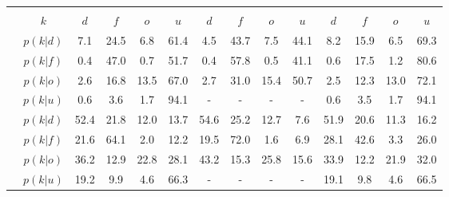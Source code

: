 \begin{center}
\begin{tabular}{c|c|cccc|cccc|cccc}
		\multicolumn{13}{c}{}\\
		&$k$ & $d$ & $f$ & $o$ & $u$ & $d$ & $f$ & $o$ & $u$ & $d$ & $f$ & $o$ & $u$\\
		\hline
		\parbox[t]{2mm}{}&$p(k|d)$ & \textcolor{mygreen}{7.1} & \textcolor{myred}{24.5} & \textcolor{myred}{6.8} & 61.4 & \textcolor{mygreen}{4.5} & \textcolor{myred}{43.7} & \textcolor{myred}{7.5} & 44.1 & \textcolor{mygreen}{8.2} & \textcolor{myred}{15.9} & \textcolor{myred}{6.5} & 69.3\\
		&$p(k|f)$ & \textcolor{myred}{0.4} & \textcolor{mygreen}{47.0} & \textcolor{myred}{0.7} & 51.7 & \textcolor{myred}{0.4} & \textcolor{mygreen}{57.8} & \textcolor{myred}{0.5} & 41.1 & \textcolor{myred}{0.6} & \textcolor{mygreen}{17.5} & \textcolor{myred}{1.2} & 80.6\\
		&$p(k|o)$ & \textcolor{myred}{2.6} & \textcolor{myred}{16.8} & \textcolor{mygreen}{13.5} & 67.0 & \textcolor{myred}{2.7} & \textcolor{myred}{31.0} & \textcolor{mygreen}{15.4} & 50.7 & \textcolor{myred}{2.5} & \textcolor{myred}{12.3} & \textcolor{mygreen}{13.0} & 72.1\\
		&$p(k|u)$ & 0.6 & 3.6 & 1.7 & 94.1 & - & - & - & - & 0.6 & 3.5 & 1.7 & 94.1\\
		\hline
		\parbox[t]{2mm}{}&$p(k|d)$ & \textcolor{mygreen}{52.4} & \textcolor{myred}{21.8} & \textcolor{myred}{12.0} & 13.7 & \textcolor{mygreen}{54.6} & \textcolor{myred}{25.2} & \textcolor{myred}{12.7} & 7.6 & \textcolor{mygreen}{51.9} & \textcolor{myred}{20.6} & \textcolor{myred}{11.3} & 16.2\\
		&$p(k|f)$ & \textcolor{myred}{21.6} & \textcolor{mygreen}{64.1} & \textcolor{myred}{2.0} & 12.2 & \textcolor{myred}{19.5} & \textcolor{mygreen}{72.0} & \textcolor{myred}{1.6} & 6.9 & \textcolor{myred}{28.1} & \textcolor{mygreen}{42.6} & \textcolor{myred}{3.3} & 26.0\\
		&$p(k|o)$ & \textcolor{myred}{36.2} & \textcolor{myred}{12.9} & \textcolor{mygreen}{22.8} & 28.1 & \textcolor{myred}{43.2} & \textcolor{myred}{15.3} & \textcolor{mygreen}{25.8} & 15.6 & \textcolor{myred}{33.9} & \textcolor{myred}{12.2} & \textcolor{mygreen}{21.9} & 32.0\\
		&$p(k|u)$ & 19.2 & 9.9 & 4.6 & 66.3 & - & - & - & - & 19.1 & 9.8 & 4.6 & 66.5\\
		\hline

\end{tabular}
\end{center}
